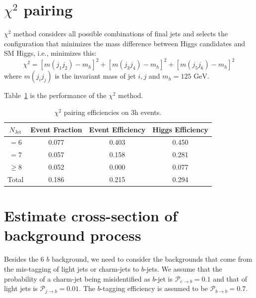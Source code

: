 \documentclass[12pt]{article}
\begin{document}
\section{\texorpdfstring{$\chi^2$}{chi2} pairing}%
\label{sec:chi2_pairing}
	$\chi^2$ method considers all possible combinations of final jets and selects the configuration that minimizes the mass difference between Higgs candidates and SM Higgs, i.e., minimizes this:
	\begin{equation}\label{eq:triHiggs_chisq}
		\chi^2 = [m(j_1j_2) - m_h]^2 + [m(j_3j_4) - m_h]^2 + [m(j_5j_6) - m_h]^2
	\end{equation}
	where $m(j_ij_j)$ is the invariant mass of jet $i, j$ and $m_h = \text{125 GeV}$.

	Table~\ref{tab:chi2_pairing_triHiggs_0b} is the performance of the $\chi^2$ method.
	\begin{table}[htpb]
		\centering
		\caption{$\chi^2$ pairing efficiencies on 3h events.}
		\label{tab:chi2_pairing_triHiggs_0b}
		\begin{tabular}{c|c|cc}
			$N_\text{Jet}$ & Event Fraction & Event Efficiency & Higgs Efficiency \\
			\hline
			$=6$	  &   0.077             &    0.403              &    0.450             \\
			$=7$	  &   0.057             &    0.158              &    0.281             \\
			$\ge 8$	  &   0.052             &    0.000              &    0.077             \\
			Total	  &   0.186             &    0.215              &    0.294
		\end{tabular}
	\end{table}
\section{Estimate cross-section of background process}%
\label{sec:estimate_cross_section_of_background_process}
	Besides the 6 $b$ background, we need to consider the backgrounds that come from the mis-tagging of light jets or charm-jets to $b$-jets. We assume that the probability of a charm-jet being misidentified as $b$-jet is $\mathcal{P}_{c\to b} = 0.1$ and that of light jets is $\mathcal{P}_{j\to b} = 0.01$. The $b$-tagging efficiency is assumed to be $\mathcal{P}_{b\to b} = 0.7$.
\end{document}

